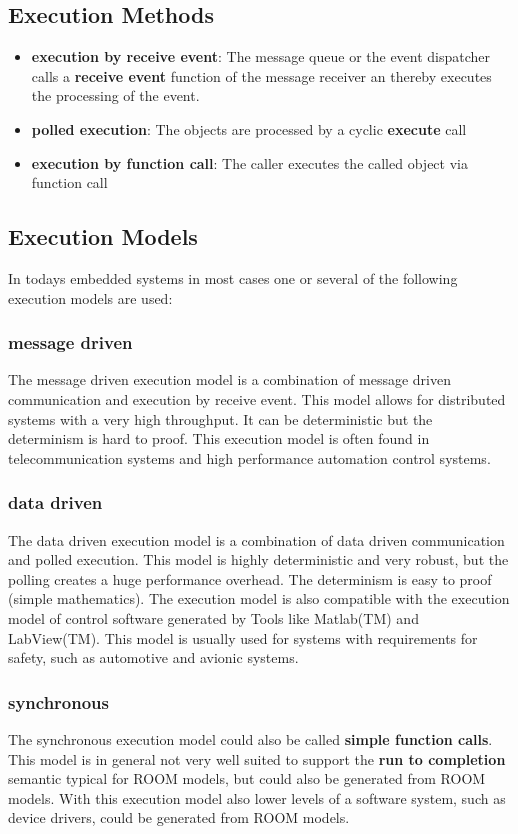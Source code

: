 \subsection{Execution Methods}

\begin{itemize}
\item \textbf{execution by receive event}: The message queue or the event dispatcher calls a \textbf{receive event} function of the message receiver an thereby executes the processing of the event.
\item \textbf{polled execution}: The objects are processed by a cyclic \textbf{execute} call
\item \textbf{execution by function call}: The caller executes the called object via function call
\end{itemize}

\subsection{Execution Models}

In todays embedded systems in most cases one or several of the following execution models are used:

\subsubsection{message driven}

The message driven execution model is a combination of message driven communication and execution by receive event.
This model allows for distributed systems with a very high throughput.
It can be deterministic but the determinism is hard to proof.
This execution model is often found in telecommunication systems and high performance automation control systems.

\subsubsection{data driven}

The data driven execution model is a combination of data driven communication and polled execution.
This model is highly deterministic and very robust, but the polling creates a huge performance overhead.
The determinism is easy to proof (simple mathematics). 
The execution model is also compatible with the execution model of control software generated by Tools like Matlab(TM) and LabView(TM).
This model is usually used for systems with requirements for safety, such as automotive and avionic systems.

\subsubsection{synchronous}

The synchronous execution model could also be called \textbf{simple function calls}. 
This model is in general not very well suited to support the \textbf{run to completion} semantic typical for ROOM models, but could also be generated from ROOM models. 
With this execution model also lower levels of a software system, such as device drivers, could be generated from ROOM models.
